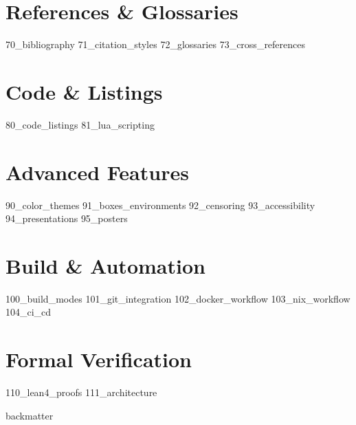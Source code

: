 \documentclass[
    language=english,
    doctype=manual,
    institution=none,
    titlestyle=book,
    oneside,
    enabletikz=false,
    enableengineering=false,
    loadGlossaries=true,
]{../../omnilatex}
\begin{document}
\part{References \& Glossaries}
{70_bibliography}
{71_citation_styles}
{72_glossaries}
{73_cross_references}

\part{Code \& Listings}
{80_code_listings}
{81_lua_scripting}

\part{Advanced Features}
{90_color_themes}
{91_boxes_environments}
{92_censoring}
{93_accessibility}
{94_presentations}
{95_posters}

\part{Build \& Automation}
{100_build_modes}
{101_git_integration}
{102_docker_workflow}
{103_nix_workflow}
{104_ci_cd}

\part{Formal Verification}
{110_lean4_proofs}
{111_architecture}

{backmatter}
\end{document}
